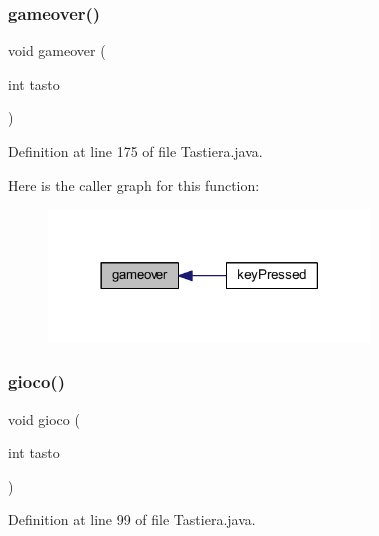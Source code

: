 \subsubsection{\texorpdfstring{gameover()}{gameover()}}
{\footnotesize\ttfamily void gameover (\begin{DoxyParamCaption}\item[{int}]{tasto }\end{DoxyParamCaption})}



Definition at line 175 of file Tastiera.\+java.

Here is the caller graph for this function\+:
\nopagebreak
\begin{figure}[H]
\begin{center}
\leavevmode
\includegraphics[width=242pt]{classa_1_1survival_1_1game_1_1_tastiera_a6e3f5b499ce8fa385ff315cd3115e6b7_icgraph}
\end{center}
\end{figure}
\mbox{\label{classa_1_1survival_1_1game_1_1_tastiera_a8b74f3af7a41bc6d69584817b83a067c}} 
\subsubsection{\texorpdfstring{gioco()}{gioco()}}
{\footnotesize\ttfamily void gioco (\begin{DoxyParamCaption}\item[{int}]{tasto }\end{DoxyParamCaption})}



Definition at line 99 of file Tastiera.\+java.

